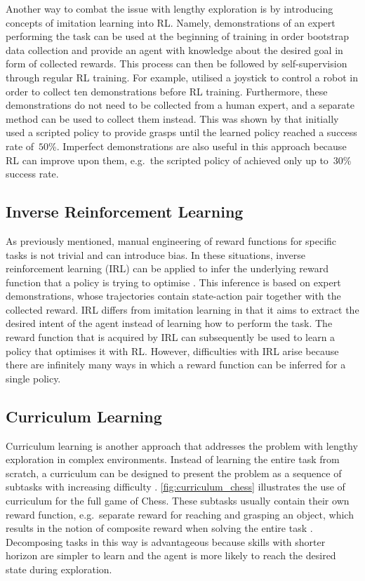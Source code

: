 Another way to combat the issue with lengthy exploration is by introducing concepts of imitation learning into RL. Namely, demonstrations of an expert performing the task can be used at the beginning of training in order bootstrap data collection and provide an agent with knowledge about the desired goal in form of collected rewards. This process can then be followed by self-supervision through regular RL training. For example, \citet{zhan_framework_2020} utilised a joystick to control a robot in order to collect ten demonstrations before RL training. Furthermore, these demonstrations do not need to be collected from a human expert, and a separate method can be used to collect them instead. This was shown by \citet{kalashnikov_qt-opt_2018} that initially used a scripted policy to provide grasps until the learned policy reached a success rate of~\(50\)\%. Imperfect demonstrations are also useful in this approach because RL can improve upon them, e.g.~the scripted policy of \citet{kalashnikov_qt-opt_2018} achieved only up to~\(30\)\% success rate.


\subsection{Inverse Reinforcement Learning}

As previously mentioned, manual engineering of reward functions for specific tasks is not trivial and can introduce bias. In these situations, inverse reinforcement learning (IRL) can be applied to infer the underlying reward function that a policy is trying to optimise \cite{kroemer_review_2021}. This inference is based on expert demonstrations, whose trajectories contain state-action pair together with the collected reward. IRL differs from imitation learning in that it aims to extract the desired intent of the agent instead of learning how to perform the task. The reward function that is acquired by IRL can subsequently be used to learn a policy that optimises it with RL. However, difficulties with IRL arise because there are infinitely many ways in which a reward function can be inferred for a single policy.


\subsection{Curriculum Learning}

Curriculum learning is another approach that addresses the problem with lengthy exploration in complex environments. Instead of learning the entire task from scratch, a curriculum can be designed to present the problem as a sequence of subtasks with increasing difficulty \cite{narvekar_curriculum_2020}. \autoref{fig:curriculum_chess} illustrates the use of curriculum for the full game of Chess. These subtasks usually contain their own reward function, e.g.~separate reward for reaching and grasping an object, which results in the notion of composite reward when solving the entire task \cite{popov_data-efficient_2017}. Decomposing tasks in this way is advantageous because skills with shorter horizon are simpler to learn and the agent is more likely to reach the desired state during exploration.

